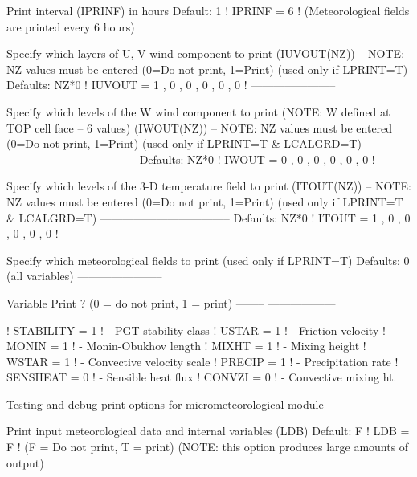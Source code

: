 \documentclass[a4paper,10pt]{article}
\begin{document}
       Print interval
       (IPRINF) in hours                   Default: 1     ! IPRINF =  6  !
       (Meteorological fields are printed
        every  6  hours)


       Specify which layers of U, V wind component
       to print (IUVOUT(NZ)) -- NOTE: NZ values must be entered
       (0=Do not print, 1=Print)
       (used only if LPRINT=T)        Defaults: NZ*0 
       ! IUVOUT =  1 ,  0 ,  0 ,  0 ,  0 ,  0  !
       -----------------------


       Specify which levels of the W wind component to print
       (NOTE: W defined at TOP cell face --  6  values)
       (IWOUT(NZ)) -- NOTE: NZ values must be entered
       (0=Do not print, 1=Print)
       (used only if LPRINT=T & LCALGRD=T)
       -----------------------------------
                                            Defaults: NZ*0 
        ! IWOUT =  0 ,  0 ,  0 ,  0 ,  0 ,  0  !


       Specify which levels of the 3-D temperature field to print
       (ITOUT(NZ)) -- NOTE: NZ values must be entered
       (0=Do not print, 1=Print)
       (used only if LPRINT=T & LCALGRD=T)
       -----------------------------------
                                            Defaults: NZ*0 
        ! ITOUT =  1 ,  0 ,  0 ,  0 ,  0 ,  0  !

       Specify which meteorological fields
       to print
       (used only if LPRINT=T)             Defaults: 0 (all variables)
       -----------------------


         Variable            Print ?
                         (0 = do not print,
                          1 = print)
         --------        ------------------

      !  STABILITY  =           1           ! - PGT stability class
      !  USTAR      =           1           ! - Friction velocity
      !  MONIN      =           1           ! - Monin-Obukhov length
      !  MIXHT      =           1           ! - Mixing height
      !  WSTAR      =           1           ! - Convective velocity scale
      !  PRECIP     =           1           ! - Precipitation rate
      !  SENSHEAT   =           0           ! - Sensible heat flux
      !  CONVZI     =           0           ! - Convective mixing ht.


       Testing and debug print options for micrometeorological module

          Print input meteorological data and
          internal variables (LDB)         Default: F       ! LDB = F !
          (F = Do not print, T = print)
          (NOTE: this option produces large amounts of output)
\end{document}
